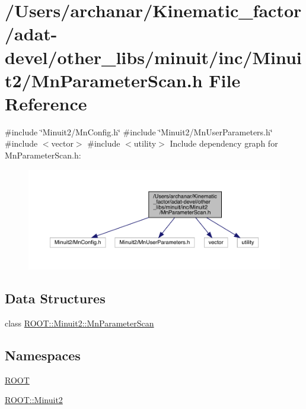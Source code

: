 \hypertarget{adat-devel_2other__libs_2minuit_2inc_2Minuit2_2MnParameterScan_8h}{}\section{/\+Users/archanar/\+Kinematic\+\_\+factor/adat-\/devel/other\+\_\+libs/minuit/inc/\+Minuit2/\+Mn\+Parameter\+Scan.h File Reference}
\label{adat-devel_2other__libs_2minuit_2inc_2Minuit2_2MnParameterScan_8h}
{\ttfamily \#include \char`\"{}Minuit2/\+Mn\+Config.\+h\char`\"{}}\newline
{\ttfamily \#include \char`\"{}Minuit2/\+Mn\+User\+Parameters.\+h\char`\"{}}\newline
{\ttfamily \#include $<$vector$>$}\newline
{\ttfamily \#include $<$utility$>$}\newline
Include dependency graph for Mn\+Parameter\+Scan.\+h\+:
\nopagebreak
\begin{figure}[H]
\begin{center}
\leavevmode
\includegraphics[width=350pt]{d1/d92/adat-devel_2other__libs_2minuit_2inc_2Minuit2_2MnParameterScan_8h__incl}
\end{center}
\end{figure}
\subsection*{Data Structures}
\begin{DoxyCompactItemize}
\item 
class \mbox{\hyperlink{classROOT_1_1Minuit2_1_1MnParameterScan}{R\+O\+O\+T\+::\+Minuit2\+::\+Mn\+Parameter\+Scan}}
\end{DoxyCompactItemize}
\subsection*{Namespaces}
\begin{DoxyCompactItemize}
\item 
 \mbox{\hyperlink{namespaceROOT}{R\+O\+OT}}
\item 
 \mbox{\hyperlink{namespaceROOT_1_1Minuit2}{R\+O\+O\+T\+::\+Minuit2}}
\end{DoxyCompactItemize}
